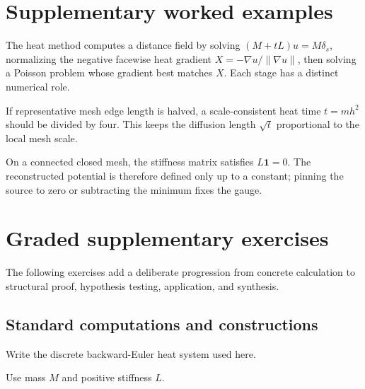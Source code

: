 \section{Supplementary worked examples}
\label{sec:vii40-pedagogy}

\begin{example}\label{ex:vii40-ped-01}
The heat method computes a distance field by solving \((M+tL)u=M\delta_s\), normalizing the negative facewise heat gradient \(X=-\nabla u/\|\nabla u\|\), then solving a Poisson problem whose gradient best matches \(X\).  Each stage has a distinct numerical role.
\end{example}

\begin{example}\label{ex:vii40-ped-02}
If representative mesh edge length is halved, a scale-consistent heat time \(t=mh^2\) should be divided by four.  This keeps the diffusion length \(\sqrt t\) proportional to the local mesh scale.
\end{example}

\begin{example}\label{ex:vii40-ped-03}
On a connected closed mesh, the stiffness matrix satisfies \(L\mathbf1=0\).  The reconstructed potential is therefore defined only up to a constant; pinning the source to zero or subtracting the minimum fixes the gauge.
\end{example}

\section{Graded supplementary exercises}
The following exercises add a deliberate progression from concrete calculation to structural proof, hypothesis testing, application, and synthesis.

\subsection*{Standard computations and constructions}

\begin{exercise}\label{exr:vii40-ped-01}
Write the discrete backward-Euler heat system used here.
\end{exercise}

\begin{hint}
Use mass \(M\) and positive stiffness \(L\).
\end{hint}

